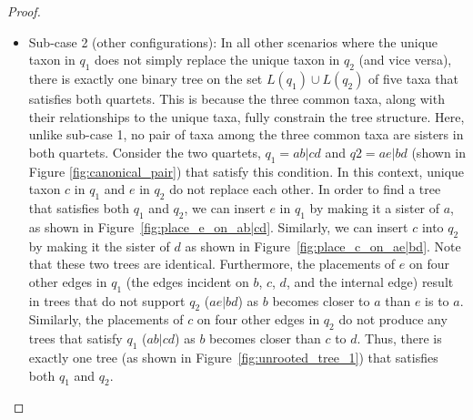 \documentclass[10pt,a4paper]{article}
\begin{document}
\begin{proof}
\begin{itemize}
\begin{itemize}
Let us now consider the two additional cases where taxon $e$ is placed on the other two branches of the quartet $ab|cd$. First, if taxon $e$ is placed as the sister taxon to $a$, one of the resulting induced quartets is $ae|bc$, which does not satisfy $ab|ce$ as $e$  is now the sister to $a$. Similarly, if $e$ is placed as the sister to $b$, the quartet $ac|be$ is formed, which also is not consistent with $ab|ce$. Thus, there are exactly three trees on $\{a,b,c,d,e\}$ that satisfy both $q_1$ and $q_2$.
\begin{figure}[h]
    \centering
    \begin{subfigure}{0.45\textwidth}
        \centering
        \caption{Placement of $e$ over the quartet $ab|cd$}
        \label{fig:place_e}
    \end{subfigure}
    \hfill %
    \begin{subfigure}{0.45\textwidth}
        \centering
        \caption{Placement of $d$ over the quartet $ab|ce$}
        \label{fig:place_d}
    \end{subfigure}
    \caption{Comparison of placements for $e$ and $d$}
    \label{fig:place_both}
\end{figure}

\item Sub-case 2 (other configurations): In all other scenarios where the unique taxon in $q_1$ does not simply replace the unique taxon in $q_2$ (and vice versa), there is exactly one binary tree on the set $L(q_1)\cup L(q_2)$ of five taxa that satisfies both quartets. This is because the three common taxa, along with their relationships to the unique taxa, fully constrain the tree structure. Here, unlike sub-case 1, no pair of taxa among the three common taxa are sisters in both quartets. Consider the two quartets, $q_1 = ab|cd$ and $q2 =  ae|bd$ (shown in Figure \ref{fig:canonical_pair}) that satisfy this condition. In this context, unique taxon $c$ in $q_1$ and $e$ in $q_2$ do not replace each other. In order to find a tree that satisfies both $q_1$ and $q_2$, we can insert $e$ in $q_1$ by making it a sister of $a$, as shown in Figure~\ref{fig:place_e_on_ab|cd}. Similarly, we can insert $c$ into $q_2$ by making it the sister of $d$ as shown in Figure~\ref{fig:place_c_on_ae|bd}. Note that these two trees are identical. Furthermore, the placements of $e$ on four other edges in $q_1$ (the edges incident on $b$, $c$, $d$, and the internal edge) result in trees that do not support $q_2$ ($ae|bd$) as $b$ becomes closer to $a$ than $e$ is to $a$. Similarly, the placements of $c$ on four other edges in $q_2$ do not produce any trees that satisfy $q_1$ ($ab|cd$) as  $b$ becomes closer than $c$ to $d$. Thus, there is exactly one tree (as shown in Figure~\ref{fig:unrooted_tree_1}) that satisfies both $q_1$ and $q_2$.


\end{itemize}
\end{itemize}
\end{proof}
\end{document}
